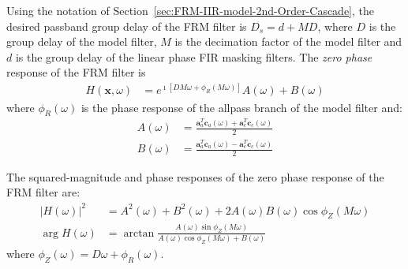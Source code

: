 \documentclass[a4paper,twoside,10pt,english]{report}
\begin{document}
Using the notation of Section~\ref{sec:FRM-IIR-model-2nd-Order-Cascade}, the
desired passband group delay of the FRM filter is $D_{s}=d+MD$,
where $D$ is the group delay of the model filter, $M$ is the decimation factor
of the model filter and $d$ is the group delay of the linear phase FIR masking
filters. The \emph{zero phase} response of the FRM filter is 
\begin{align*}
H\left(\boldsymbol{x},\omega\right) &= 
e^{\imath \left[DM\omega + \phi_{R}\left(M\omega\right)\right]}A\left(\omega\right) +
B\left(\omega\right)
\end{align*}
where $\phi_{R}\left(\omega\right)$ is the phase response of the allpass branch
of the model filter and:
\begin{align*}
A\left(\omega\right) &=
\frac{\boldsymbol{a}_{a}^{T}\boldsymbol{c}_{a}\left(\omega\right)+
\boldsymbol{a}_{c}^{T}\boldsymbol{c}_{c}\left(\omega\right)}{2} \\
B\left(\omega\right) &=
\frac{\boldsymbol{a}_{a}^{T}\boldsymbol{c}_{a}\left(\omega\right)-
\boldsymbol{a}_{c}^{T}\boldsymbol{c}_{c}\left(\omega\right)}{2}
\end{align*}

The squared-magnitude and phase responses of the zero phase response of the 
FRM filter are:
\begin{align*}
\left|H\left(\omega\right)\right|^{2}&=
A^{2}\left(\omega\right)+B^{2}\left(\omega\right) +
2A\left(\omega\right)B\left(\omega\right)\cos\phi_{Z}\left(M\omega\right)\\
\arg H\left(\omega\right) &= \arctan \frac{
A\left(\omega\right)\sin\phi_{Z}\left(M\omega\right)}{
A\left(\omega\right)\cos\phi_{Z}\left(M\omega\right) + B\left(\omega\right)}
\end{align*}
where $\phi_{Z}\left(\omega\right)=D\omega + \phi_{R}\left(\omega\right)$.
\end{document}

